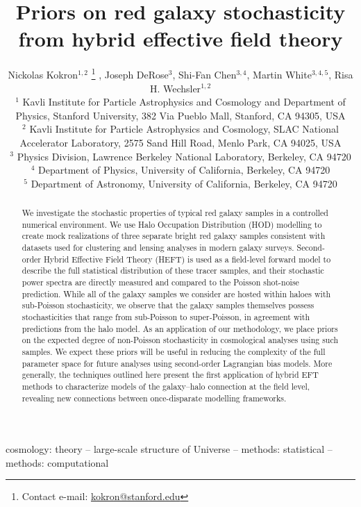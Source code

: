 \documentclass[fleqn,usenatbib]{mnras}
\author[Kokron et al.]{Nickolas Kokron$^{1,2}$
\thanks{Contact e-mail: \href{mailto:kokron@stanford.edu}{kokron@stanford.edu}}%
, Joseph DeRose$^{3}$, Shi-Fan Chen$^{3,4}$, Martin White$^{3,4,5}$, Risa H. Wechsler$^{1,2}$
\\
$^{1}$ Kavli Institute for Particle Astrophysics and Cosmology and Department of Physics, Stanford University, 382 Via Pueblo Mall, Stanford, CA 94305, USA \\ 
$^{2}$ Kavli Institute for Particle Astrophysics and Cosmology, SLAC National Accelerator Laboratory, 2575 Sand Hill Road, Menlo Park, CA 94025, USA \\
$^{3}$ Physics Division, Lawrence Berkeley National Laboratory, Berkeley, CA 94720\\
$^{4}$ Department of Physics, University of California, Berkeley, CA 94720 \\
$^{5}$ Department of Astronomy, University of California, Berkeley, CA 94720
}
\date{}
\title[HOD Stochasticity]{Priors on red galaxy stochasticity from hybrid effective field theory}%
\begin{document}
\maketitle


\begin{abstract}
We investigate the stochastic properties of typical red galaxy samples in a controlled numerical environment. We use Halo Occupation Distribution (HOD) modelling to create mock realizations of three separate bright red galaxy samples consistent with datasets used for clustering and lensing analyses in modern galaxy surveys. Second-order Hybrid Effective Field Theory (HEFT) is used as a field-level forward model to describe the full statistical distribution of these tracer samples, and their stochastic power spectra are directly measured and compared to the Poisson shot-noise prediction. While all of the galaxy samples we consider are hosted within haloes with sub-Poisson stochasticity, we observe that the galaxy samples themselves possess stochasticities that range from sub-Poisson to super-Poisson, in agreement with predictions from the halo model. As an application of our methodology, we place priors on the expected degree of non-Poisson stochasticity in cosmological analyses using such samples. We expect these priors will be useful in reducing the complexity of the full parameter space for future analyses using second-order Lagrangian bias models. More generally, the techniques outlined here present the first application of hybrid EFT methods to characterize models of the galaxy--halo connection at the field level, revealing new connections between once-disparate modelling frameworks.

\end{abstract}
\begin{keywords}
cosmology: theory -- large-scale structure of Universe -- methods: statistical -- methods: computational
\end{keywords}
\maketitle
\end{document}
